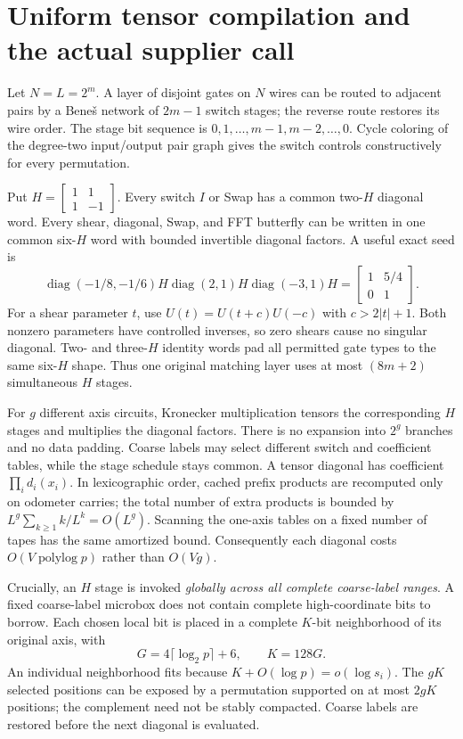 \documentclass[11pt]{article}
\newcommand{\diag}{\operatorname{diag}}
\newcommand{\plog}{\operatorname{polylog}}
\begin{document}
\section{Uniform tensor compilation and the actual supplier call}

Let $N=L=2^m$. A layer of disjoint gates on $N$ wires can be routed to adjacent pairs by a Bene\v{s} network of $2m-1$ switch stages; the reverse route restores its wire order. The stage bit sequence is $0,1,\ldots,m-1,m-2,\ldots,0$. Cycle coloring of the degree-two input/output pair graph gives the switch controls constructively for every permutation.

Put $H=\left[\begin{smallmatrix}1&1\\1&-1\end{smallmatrix}\right]$. Every switch $I$ or Swap has a common two-$H$ diagonal word. Every shear, diagonal, Swap, and FFT butterfly can be written in one common six-$H$ word with bounded invertible diagonal factors. A useful exact seed is
\[
 \diag(-1/8,-1/6)H\diag(2,1)H\diag(-3,1)H
 =\begin{bmatrix}1&5/4\\0&1\end{bmatrix}.
\]
For a shear parameter $t$, use $U(t)=U(t+c)U(-c)$ with $c>2|t|+1$. Both nonzero parameters have controlled inverses, so zero shears cause no singular diagonal. Two- and three-$H$ identity words pad all permitted gate types to the same six-$H$ shape. Thus one original matching layer uses at most $(8m+2)$ simultaneous $H$ stages.

For $g$ different axis circuits, Kronecker multiplication tensors the corresponding $H$ stages and multiplies the diagonal factors. There is no expansion into $2^g$ branches and no data padding. Coarse labels may select different switch and coefficient tables, while the stage schedule stays common. A tensor diagonal has coefficient $\prod_i d_i(x_i)$. In lexicographic order, cached prefix products are recomputed only on odometer carries; the total number of extra products is bounded by $L^g\sum_{k\geq1}k/L^k=O(L^g)$. Scanning the one-axis tables on a fixed number of tapes has the same amortized bound. Consequently each diagonal costs $O(V\plog p)$ rather than $O(Vg)$.

Crucially, an $H$ stage is invoked \emph{globally across all complete coarse-label ranges}. A fixed coarse-label microbox does not contain complete high-coordinate bits to borrow. Each chosen local bit is placed in a complete $K$-bit neighborhood of its original axis, with
\[
 G=4\lceil\log_2p\rceil+6,\qquad K=128G.
\]
An individual neighborhood fits because $K+O(\log p)=o(\log s_i)$. The $gK$ selected positions can be exposed by a permutation supported on at most $2gK$ positions; the complement need not be stably compacted. Coarse labels are restored before the next diagonal is evaluated.
\end{document}
